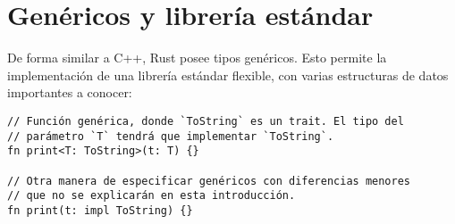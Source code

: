 \section{Genéricos y librería estándar}

De forma similar a C++, Rust posee tipos genéricos. Esto permite la
implementación de una librería estándar flexible, con varias estructuras de
datos importantes a conocer:

\begin{verbatim}
// Función genérica, donde `ToString` es un trait. El tipo del
// parámetro `T` tendrá que implementar `ToString`.
fn print<T: ToString>(t: T) {}

// Otra manera de especificar genéricos con diferencias menores
// que no se explicarán en esta introducción.
fn print(t: impl ToString) {}
\end{verbatim}

